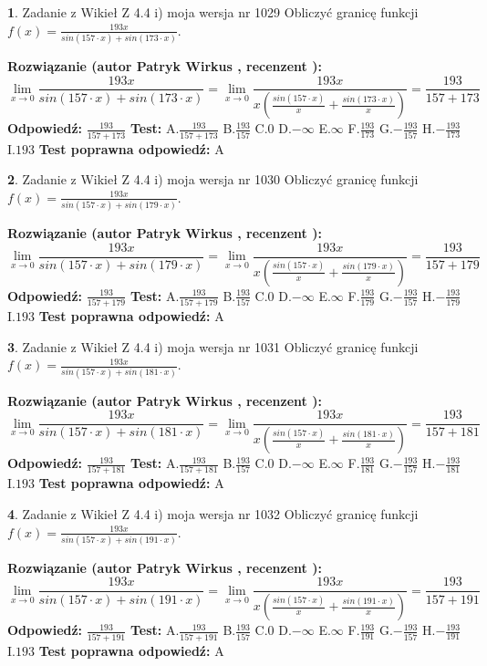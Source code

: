 \documentclass[12pt, a4paper]{article}
\theoremstyle{definition} %
\newtheorem{zad}{}
\newcommand{\zadStart}[1]{\begin{zad}#1\newline}
\newcommand{\zadStop}{\end{zad}}
\newcommand{\rozwStart}[2]{\noindent \textbf{Rozwiązanie (autor #1 , recenzent #2): }\newline}
\newcommand{\rozwStop}{\newline}
\newcommand{\odpStart}{\noindent \textbf{Odpowiedź:}\newline}
\newcommand{\odpStop}{\newline}
\newcommand{\testStart}{\noindent \textbf{Test:}\newline}
\newcommand{\testStop}{\newline}
\newcommand{\kluczStart}{\noindent \textbf{Test poprawna odpowiedź:}\newline}
\newcommand{\kluczStop}{\newline}
\begin{document}
\zadStart{Zadanie z Wikieł Z 4.4 i) moja wersja nr 1029}
Obliczyć granicę funkcji $f(x)=\frac{193x}{sin(157\cdot x) +sin(173\cdot x)}$.
\zadStop
\rozwStart{Patryk Wirkus}{}
$$\lim\limits_{x\to 0}\frac{193x}{sin(157\cdot x) +sin(173\cdot x)}=\lim\limits_{x\to 0}\frac{193x}{x(\frac{sin(157\cdot x)}{x}+\frac{sin(173\cdot x)}{x})}=\frac{193}{157+173}$$
\rozwStop
\odpStart
$\frac{193}{157+173}$
\odpStop
\testStart
A.$\frac{193}{157+173}$
B.$\frac{193}{157}$
C.$0$
D.$-\infty$
E.$\infty$
F.$\frac{193}{173}$
G.$-\frac{193}{157}$
H.$-\frac{193}{173}$
I.$193$
\testStop
\kluczStart
A
\kluczStop



\zadStart{Zadanie z Wikieł Z 4.4 i) moja wersja nr 1030}
Obliczyć granicę funkcji $f(x)=\frac{193x}{sin(157\cdot x) +sin(179\cdot x)}$.
\zadStop
\rozwStart{Patryk Wirkus}{}
$$\lim\limits_{x\to 0}\frac{193x}{sin(157\cdot x) +sin(179\cdot x)}=\lim\limits_{x\to 0}\frac{193x}{x(\frac{sin(157\cdot x)}{x}+\frac{sin(179\cdot x)}{x})}=\frac{193}{157+179}$$
\rozwStop
\odpStart
$\frac{193}{157+179}$
\odpStop
\testStart
A.$\frac{193}{157+179}$
B.$\frac{193}{157}$
C.$0$
D.$-\infty$
E.$\infty$
F.$\frac{193}{179}$
G.$-\frac{193}{157}$
H.$-\frac{193}{179}$
I.$193$
\testStop
\kluczStart
A
\kluczStop



\zadStart{Zadanie z Wikieł Z 4.4 i) moja wersja nr 1031}
Obliczyć granicę funkcji $f(x)=\frac{193x}{sin(157\cdot x) +sin(181\cdot x)}$.
\zadStop
\rozwStart{Patryk Wirkus}{}
$$\lim\limits_{x\to 0}\frac{193x}{sin(157\cdot x) +sin(181\cdot x)}=\lim\limits_{x\to 0}\frac{193x}{x(\frac{sin(157\cdot x)}{x}+\frac{sin(181\cdot x)}{x})}=\frac{193}{157+181}$$
\rozwStop
\odpStart
$\frac{193}{157+181}$
\odpStop
\testStart
A.$\frac{193}{157+181}$
B.$\frac{193}{157}$
C.$0$
D.$-\infty$
E.$\infty$
F.$\frac{193}{181}$
G.$-\frac{193}{157}$
H.$-\frac{193}{181}$
I.$193$
\testStop
\kluczStart
A
\kluczStop



\zadStart{Zadanie z Wikieł Z 4.4 i) moja wersja nr 1032}
Obliczyć granicę funkcji $f(x)=\frac{193x}{sin(157\cdot x) +sin(191\cdot x)}$.
\zadStop
\rozwStart{Patryk Wirkus}{}
$$\lim\limits_{x\to 0}\frac{193x}{sin(157\cdot x) +sin(191\cdot x)}=\lim\limits_{x\to 0}\frac{193x}{x(\frac{sin(157\cdot x)}{x}+\frac{sin(191\cdot x)}{x})}=\frac{193}{157+191}$$
\rozwStop
\odpStart
$\frac{193}{157+191}$
\odpStop
\testStart
A.$\frac{193}{157+191}$
B.$\frac{193}{157}$
C.$0$
D.$-\infty$
E.$\infty$
F.$\frac{193}{191}$
G.$-\frac{193}{157}$
H.$-\frac{193}{191}$
I.$193$
\testStop
\kluczStart
A
\kluczStop
\end{document}
